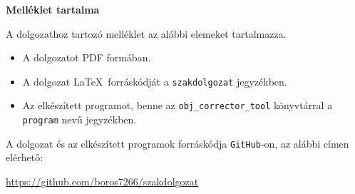 \pagestyle{empty}

\noindent \textbf{\Large Melléklet tartalma}

\vskip 1cm

\noindent A dolgozathoz tartozó melléklet az alábbi elemeket tartalmazza.
\begin{itemize}
\item A dolgozatot PDF formában.
\item A dolgozat \LaTeX\ forráskódját a \texttt{szakdolgozat} jegyzékben.
\item Az elkészített programot, benne az \texttt{obj\_corrector\_tool} könyvtárral a \texttt{program} nevű jegyzékben.
\end{itemize}

\noindent A dolgozat és az elkészített programok forráskódja \texttt{GitHub}-on, az alábbi címen elérhető:

\bigskip

\quad \url{https://github.com/boros7266/szakdolgozat}

\pagebreak
